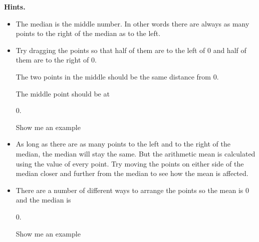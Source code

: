 \documentclass{article}
\begin{document}
\textbf{Hints.}
\begin{itemize}
  \item The median is the middle number. In other words there
                        are always as many points to the right of the median
                        as to the left.
  \item Try dragging the points so that half of them are to
                        the left of 
                        0 and half of them
                        are to the right of 
                        0.
                        
                            The two points in the middle should be the same
                            distance from 
                            0.
                        
                        
                            The middle point should be at
                            
                            0.
                        
                        
                            Show me an example
  \item As long as there are as many points to the left and to
                        the right of the median, the median will stay the same.
                        But the arithmetic mean is calculated using the value
                        of every point. Try moving the points on either side
                        of the median closer and further from the median to
                        see how the mean is affected.
  \item There are a number of different ways to arrange the
                        points so the mean is 
                        0 and the median is
                        
                        0.
                        
                            Show me an example
\end{itemize}
\end{document}
